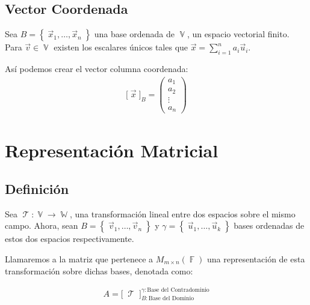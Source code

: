 \documentclass[12pt, fleqn]{report}                             %
\theoremstyle{break}                                            %
\DeclareMathOperator \GenericField {\mathbb{F}}                 %
\DeclareMathOperator \VectorSet    {\mathbb{V}}                 %
\DeclareMathOperator \SubVectorSet {\mathbb{W}}                 %
\DeclareMathOperator \LinTrans {\mathcal{T}}                    %
\newcommand{\Set}[1]    {\left\{ \; #1 \; \right\}}             %
\newcommand{\bigBrackets}[1] {\big[ \; #1 \; \big]}             %
\newcommand{\BigBrackets}[1] {\Big[ \; #1 \; \Big]}             %
\newcommand{\pVector}[1]                                        %
        { \ensuremath{\begin{pmatrix}#1\end{pmatrix}} }             %
\begin{document}
            \subsection{Vector Coordenada}

                Sea $B = \Set{\vec x_1, \dots, \vec x_n}$ una base ordenada de $\VectorSet$, un espacio
                vectorial finito. Para $\vec v \in \VectorSet$ existen los escalares únicos
                tales que $\displaystyle \vec x = \sum_{i=1}^n a_i \vec u_i$.

                Así podemos crear el vector columna coordenada:
                \begin{align*}
                    \bigBrackets{\vec x}_{B}
                    =
                    \pVector{a_1 \\ a_2 \\ \vdots \\a_n}
                \end{align*}


        \clearpage
        \section{Representación Matricial}

            \subsection{Definición}

                Sea $\LinTrans: \VectorSet \to \SubVectorSet$, una transformación lineal
                entre dos espacios sobre el mismo campo.
                Ahora, sean $B = \Set{\vec v_1, \dots, \vec v_n}$ y $\gamma = \Set{\vec u_1, \dots, \vec u_k}$
                bases ordenadas de estos dos espacios respectivamente.

                Llamaremos a la matriz que pertenece a $M_{m \times n}(\GenericField)$ una
                representación de esta transformación sobre dichas bases, denotada como: 

                \begin{align*}
                    A = \BigBrackets{\LinTrans}_{B: \text{Base del Dominio}}^{\gamma: \text{Base del Contradominio}}
                \end{align*}
\end{document}
